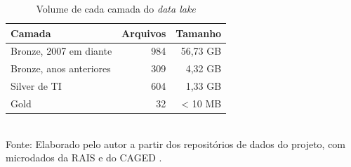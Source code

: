 \begin{table}[htbp]
    \centering
    \caption{Volume de cada camada do \textit{data lake}}
    \label{tab:volumes}
    \footnotesize
    \renewcommand{\arraystretch}{1.25}
    \begin{tabular}{lrr}
        \toprule
        \rowcolor{black!8}
        \textbf{Camada} & \textbf{Arquivos} & \textbf{Tamanho} \\
        \midrule
        Bronze, 2007 em diante & 984 & 56,73 GB \\
        Bronze, anos anteriores & 309 & 4,32 GB \\
        Silver de TI & 604 & 1,33 GB \\
        Gold & 32 & < 10 MB \\
        \bottomrule
    \end{tabular}
    \\[4pt]
    Fonte: Elaborado pelo autor a partir dos repositórios de dados do projeto, com microdados da RAIS e do CAGED \cite{RAIS2024, CAGED2024}.
\end{table}
